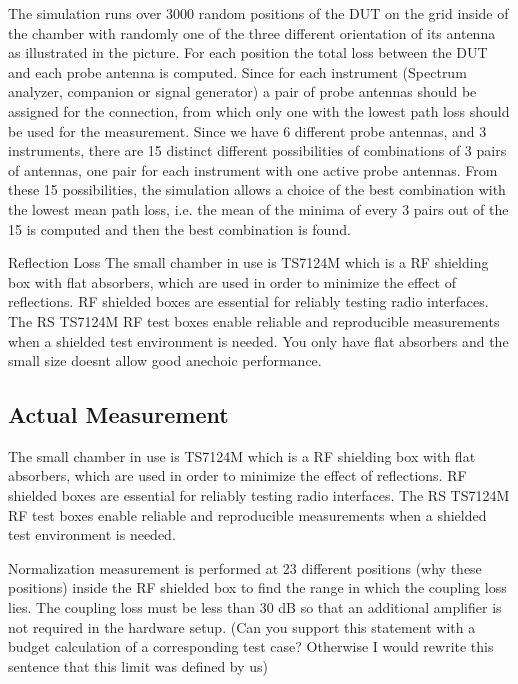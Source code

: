    
   
   
The simulation runs over 3000 random positions of the DUT on the grid inside of the chamber with randomly one of the three different orientation of its antenna as illustrated in the picture. For each position the total loss between the DUT and each probe antenna is computed. Since for each instrument (Spectrum analyzer, companion or signal generator) a pair of probe antennas should be assigned for the connection, from which only one with the lowest path loss should be used for the measurement. Since we have 6 different probe antennas, and 3 instruments, there are 15 distinct different possibilities of combinations of 3 pairs of antennas, one pair for each instrument with one active probe antennas. From these 15 possibilities, the simulation allows a choice of the best combination with the lowest mean path loss, i.e. the mean of the minima of every 3 pairs out of the 15 is computed and then the best combination is found.


Reflection Loss
  \noindent The small chamber in use is TS7124M which is a \acs{RF} shielding box with flat absorbers, which are used in order to minimize the effect of reflections. \acs{RF} shielded boxes are essential for reliably testing radio interfaces. The \acs{RS}\textregistered{} TS7124M \acs{RF} test boxes enable reliable and reproducible measurements when a shielded test environment is needed. You only have flat absorbers and the small size doesnt allow good anechoic performance.

\subsection{Actual Measurement} 
The small chamber in use is TS7124M which is a \acs{RF} shielding box with flat absorbers, which are used in order to minimize the effect of reflections. \acs{RF} shielded boxes are essential for reliably testing radio interfaces. The \acs{RS}\textregistered{} TS7124M \acs{RF} test boxes enable reliable and reproducible measurements when a shielded test environment is needed.

Normalization measurement is performed at 23 different positions (why these positions) inside the RF shielded box to find the range in which the coupling loss lies. The coupling loss must be less than 30 dB so that an additional amplifier is not required in the hardware setup. (Can you support this statement with a budget calculation of a corresponding test case? Otherwise I would rewrite this sentence that this limit was defined by us)

